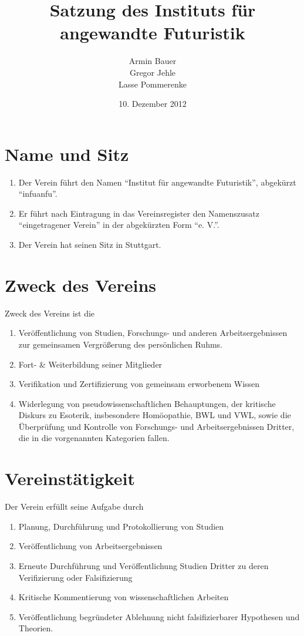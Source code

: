 \documentclass[a4paper]{article}
\author{Armin Bauer\\
Gregor Jehle\\
Lasse Pommerenke}
\date{10. Dezember 2012}
\title{Satzung des Instituts für angewandte Futuristik}
\begin{document}
\maketitle


\section{Name und Sitz}\label{sec:name_und_sitz}

\begin{enumerate}
\item Der Verein führt den Namen "`Institut für angewandte Futuristik"', abgekürzt "`infuanfu"'.
\item Er führt nach Eintragung in das Vereinsregister den Namenszusatz "`eingetragener Verein"' in der abgekürzten Form "`e. V."'.
\item Der Verein hat seinen Sitz in Stuttgart.
\end{enumerate}


\section{Zweck des Vereins}\label{sec:zweck_des_vereins}

Zweck des Vereins ist die
\begin{enumerate}
\item Veröffentlichung von Studien, Forschungs- und anderen Arbeitsergebnissen zur gemeinsamen Vergrößerung des persönlichen Ruhms.
\item Fort- \& Weiterbildung seiner Mitglieder
\item Verifikation und Zertifizierung von gemeinsam erworbenem Wissen
\item Widerlegung von pseudowissenschaftlichen Behauptungen, der kritische Diskurs zu Esoterik, insbesondere Homöopathie, BWL und VWL, sowie die Überprüfung und Kontrolle von Forschungs- und Arbeitsergebnissen Dritter, die in die vorgenannten Kategorien fallen.
\end{enumerate}


\section{Vereinstätigkeit}\label{sec:vereinstaetigkeit}

Der Verein erfüllt seine Aufgabe durch
\begin{enumerate}
\item Planung, Durchführung und Protokollierung von Studien
\item Veröffentlichung von Arbeitsergebnissen 
\item Erneute Durchführung und Veröffentlichung Studien Dritter zu deren Verifizierung oder Falsifizierung
\item Kritische Kommentierung von wissenschaftlichen Arbeiten
\item Veröffentlichung begründeter Ablehnung nicht falsifizierbarer Hypothesen und Theorien.
\end{enumerate}
\end{document}
